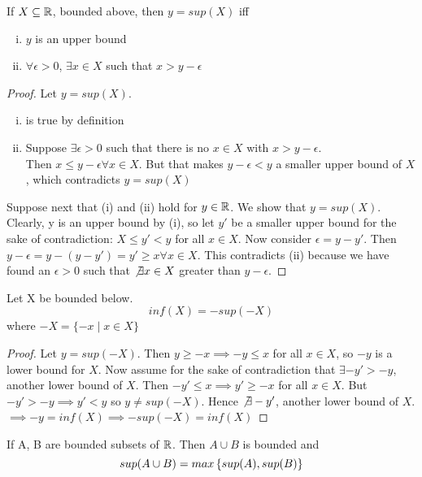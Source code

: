 \begin{proposition}
	If $X\subseteq \mathbb{R}$, bounded above, then $y = sup(X)$ iff
	\begin{enumerate}[(i)]
		\item $y$ is an upper bound
		\item $\forall \epsilon > 0$, $\exists x\in X$ such that $x>y-\epsilon$
	\end{enumerate}
\end{proposition}
\begin{proof}
Let $y = sup(X)$. \begin{enumerate}[(i)]
\item is true by definition
\item Suppose $\exists \epsilon > 0$ such that there is no $x\in X$ with $x>y-\epsilon$. \\
Then $x\leq y-\epsilon \forall x\in X$. But that makes $y-\epsilon < y$ a smaller upper bound of $X$, which contradicts $y=sup(X)$
\end{enumerate}

Suppose next that (i) and (ii) hold for $y\in \mathbb{R}$. We show that $y = sup(X)$. Clearly, y is an upper bound by (i), so let $y'$ be a smaller upper bound for the sake of contradiction: $X\leq y' < y$ for all $x\in X$. Now consider $\epsilon = y-y'$. Then $y-\epsilon = y- (y-y') = y' \geq x \forall x\in X$. This contradicts (ii) because we have found an $\epsilon > 0$ such that $\not \exists x \in X$ greater than $y-\epsilon$.
\end{proof}

\begin{proposition}
	Let X be bounded below.
	\[inf(X) = -sup(-X)\]
	where $-X = \{-x \mid x\in X\}$
\end{proposition}

\begin{proof}
	Let $y = sup (-X)$. Then $y \geq -x \implies -y \leq x$ for all $x\in X$, so $-y$ is a lower bound for $X$. Now assume for the sake of contradiction that $\exists -y' > -y$, another lower bound of $X$. Then $-y' \leq x \implies y' \geq -x$ for all $x\in X$. But $-y' > -y \implies y' < y$ so $y \neq sup(-X)$. Hence $\not \exists -y'$, another lower bound of $X$. $\implies -y = inf(X) \implies -sup(-X) = inf(X)$
\end{proof}

\begin{proposition}\label{1.5}
	If A, B are bounded subsets of $\mathbb{R}$. Then $A\cup B$ is bounded and
	\[sup(A\cup B) = max\left\{ sup(A), sup(B) \right\}\]
\end{proposition}
